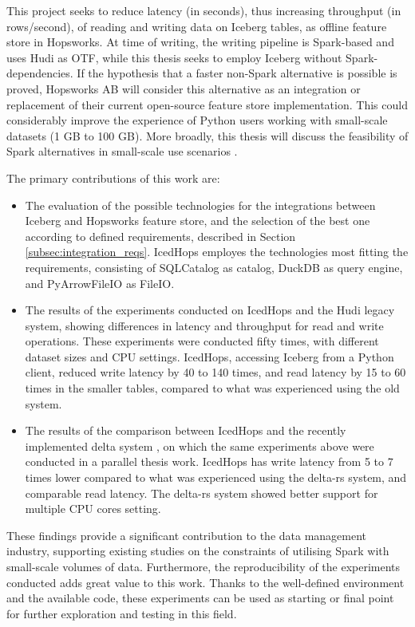 This project seeks to reduce latency (in seconds), thus increasing throughput (in rows/second), of reading and writing data on Iceberg tables, as offline feature store in Hopsworks. At time of writing, the writing pipeline is Spark-based and uses Hudi as \gls{OTF}, while this thesis seeks to employ Iceberg without Spark-dependencies. If the hypothesis that a faster non-Spark alternative is possible is proved, Hopsworks AB will consider this alternative as an integration or replacement of their current open-source feature store implementation. This could considerably improve the experience of Python users working with small-scale datasets (1 GB to 100 GB). More broadly, this thesis will discuss the feasibility of Spark alternatives in small-scale use scenarios \cite{manfrediReducingReadWrite2024}.

The primary contributions of this work are:
\begin{itemize}
    \item The evaluation of the possible technologies for the integrations between Iceberg and Hopsworks feature store, and the selection of the best one according to defined requirements, described in Section \ref{subsec:integration_reqs}. IcedHops employes the technologies most fitting the requirements, consisting of SQLCatalog as catalog, DuckDB as query engine, and PyArrowFileIO as FileIO.
    \item The results of the experiments conducted on IcedHops and the Hudi legacy system, showing differences in latency and throughput for read and write operations. These experiments were conducted fifty times, with different dataset sizes and \gls{CPU} settings. IcedHops, accessing Iceberg from a Python client, reduced write latency by 40 to 140 times, and read latency by 15 to 60 times in the smaller tables, compared to what was experienced using the old system.
    \item The results of the comparison between IcedHops and the recently implemented delta system \cite{manfrediReducingReadWrite2024}, on which the same experiments above were conducted in a parallel thesis work. IcedHops has write latency from 5 to 7 times lower compared to what was experienced using the delta-rs system, and comparable read latency. The delta-rs system showed better support for multiple \gls{CPU} cores setting.
\end{itemize}

These findings provide a significant contribution to the data management industry, supporting existing studies on the constraints of utilising Spark with small-scale volumes of data. Furthermore, the reproducibility of the experiments conducted adds great value to this work. Thanks to the well-defined environment and the available code, these experiments can be used as starting or final point for further exploration and testing in this field. 
